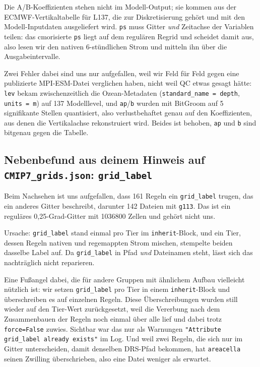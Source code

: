 \documentclass[11pt,a4paper]{article}
\newcommand{\code}[1]{\texttt{\small #1}}
\begin{document}
Die A/B-Koeffizienten stehen nicht im Modell-Output; sie kommen aus der
ECMWF-Vertikaltabelle f\"ur L137, die zur Diskretisierung geh\"ort und mit den
Modell-Inputdaten ausgeliefert wird. \code{ps} muss Gitter \emph{und} Zeitachse der
Variablen teilen: das cmorisierte \code{ps} liegt auf dem regul\"aren Regrid und
scheidet damit aus, also lesen wir den nativen 6-st\"undlichen Strom und mitteln ihn
\"uber die Ausgabeintervalle.

Zwei Fehler dabei sind uns nur aufgefallen, weil wir Feld f\"ur Feld gegen eine
publizierte MPI-ESM-Datei verglichen haben, nicht weil QC etwas gesagt h\"atte:
\code{lev} bekam zwischenzeitlich die Ozean-Metadaten (\code{standard\_name = depth},
\code{units = m}) auf 137 Modelllevel, und \code{ap}/\code{b} wurden mit BitGroom auf
5 signifikante Stellen quantisiert, also verlustbehaftet genau auf den Koeffizienten,
aus denen die Vertikalachse rekonstruiert wird. Beides ist behoben, \code{ap} und
\code{b} sind bitgenau gegen die Tabelle.

\subsection*{Nebenbefund aus deinem Hinweis auf \code{CMIP7\_grids.json}: \code{grid\_label}}

Beim Nachsehen ist uns aufgefallen, dass 161 Regeln ein \code{grid\_label} trugen,
das ein anderes Gitter beschreibt, darunter 142 Dateien mit \code{g113}. Das ist ein
regul\"ares 0{,}25-Grad-Gitter mit 1036800 Zellen und geh\"ort nicht uns.

Ursache: \code{grid\_label} stand einmal pro Tier im \code{inherit}-Block, und ein
Tier, dessen Regeln nativen und regemappten Strom mischen, stempelte beiden dasselbe
Label auf. Da \code{grid\_label} in Pfad \emph{und} Dateinamen steht, l\"asst sich das
nachtr\"aglich nicht reparieren.

Eine Fu\ss angel dabei, die f\"ur andere Gruppen mit \"ahnlichem Aufbau vielleicht
n\"utzlich ist: wir setzen \code{grid\_label} pro Tier in einem
\code{inherit}-Block und \"uberschreiben es auf einzelnen Regeln. Diese
\"Uberschreibungen wurden still wieder auf den Tier-Wert zur\"uckgesetzt, weil die
Vererbung nach dem Zusammenbauen der Regeln noch einmal \"uber alle lief und dabei
trotz \code{force=False} zuwies. Sichtbar war das nur als Warnungen
\code{"Attribute grid\_label already exists"} im Log. Und weil zwei Regeln, die
sich nur im Gitter unterscheiden, damit denselben DRS-Pfad bekommen, hat
\code{areacella} seinen Zwilling \"uberschrieben, also eine Datei weniger als
erwartet.
\end{document}
